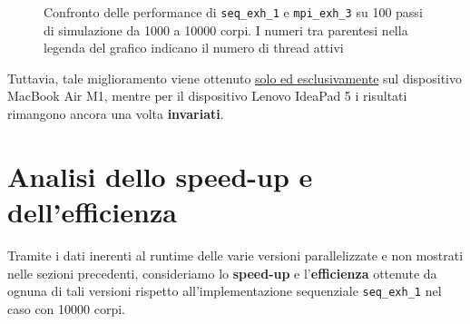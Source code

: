 \documentclass[12pt]{report}
\begin{document}
\begin{figure}[H]

        \caption{Confronto delle performance di \texttt{seq\_exh\_1} e \texttt{mpi\_exh\_3} su 100 passi di simulazione da 1000 a 10000 corpi. I numeri tra parentesi nella legenda del grafico indicano il numero di thread attivi}
        \label{fig:mpi_3_exh_graph}
    \end{figure}

    Tuttavia, tale miglioramento viene ottenuto \underline{solo ed esclusivamente} sul dispositivo MacBook Air M1, mentre per il dispositivo Lenovo IdeaPad 5 i risultati rimangono ancora una volta \textbf{invariati}.

    \newpage

    \section{Analisi dello speed-up e dell'efficienza}

    Tramite i dati inerenti al runtime delle varie versioni parallelizzate e non mostrati nelle sezioni precedenti, consideriamo lo \textbf{speed-up} e l'\textbf{efficienza} ottenute da ognuna di tali versioni rispetto all'implementazione sequenziale \texttt{seq\_exh\_1} nel caso con 10000 corpi.
\end{document}
